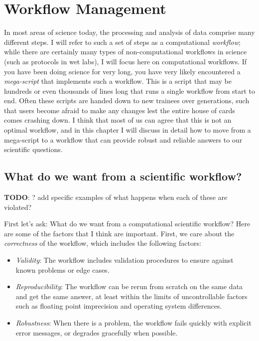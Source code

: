 \chapter{Workflow Management}

In most areas of science today, the processing and analysis of data comprise many different steps.  I will refer to such a set of steps as a computational \textit{workflow}; while there are certainly many types of non-computational workflows in science (such as protocols in wet labs), I will focus here on computational workflows. If you have been doing science for very long, you have very likely encountered a \textit{mega-script} that implements such a workflow. This is a script that may be hundreds or even thousands of lines long that runs a single workflow from start to end.  Often these scripts are handed down to new trainees over generations, such that users become afraid to make any changes lest the entire house of cards comes crashing down.  I think that most of us can agree that this is not an optimal workflow, and in this chapter I will discuss in detail how to move from a mega-script to a workflow that can provide robust and reliable answers to our scientific questions.

\section{What do we want from a scientific workflow?}

\textbf{TODO}: ? add specific examples of what happens when each of these are violated?

First let's ask: What do we want from a computational scientific workflow?  Here are some of the factors that I think are important.  First, we care about the \textit{correctness} of the workflow, which includes the following factors:

\begin{itemize}
\item \textit{Validity}:  The workflow includes validation procedures to ensure against known problems or edge cases.
\item \textit{Reproducibility}:  The workflow can be rerun from scratch on the same data and get the same answer, at least within the limits of uncontrollable factors such as floating point imprecision and operating system differences.
\item \textit{Robustness}: When there is a problem, the workflow fails quickly with explicit error messages, or degrades gracefully when possible.
\end{itemize}

